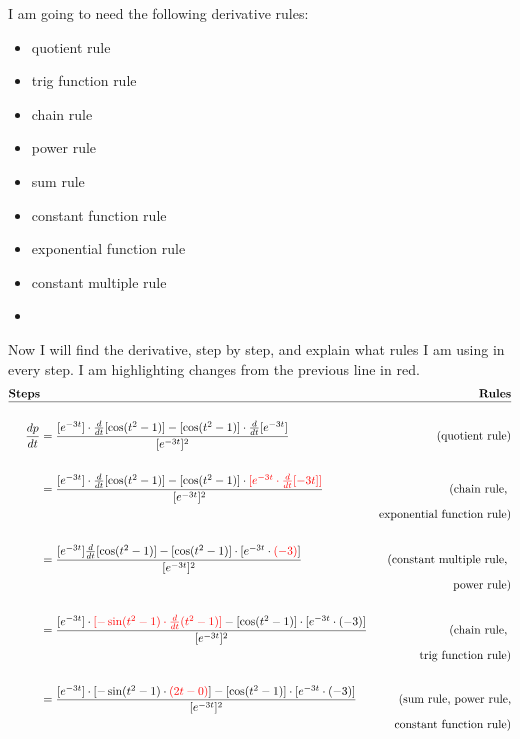 \documentclass[letter, 12pt]{article}
\newcommand{\red}[1]{\textcolor{red}{#1}}
\newcommand{\diff}[1]{\frac{d}{d#1}}
\begin{document}
I am going to need the following derivative rules:
\begin{multicols}{3}
	\begin{itemize}
		\item quotient rule
		\item trig function rule
		\item chain rule
		\item power rule
		\item sum rule
		\item constant function rule
		\item exponential function rule
		\item constant multiple rule
		\item[]
	\end{itemize}
\end{multicols}
Now I will find the derivative, step by step, and 
explain what rules I am using in every step.
I am highlighting changes from the previous line in red.
\begin{align*}
\textbf{Steps}& 
& \textbf{Rules} \\\hline
&&\\
\frac{dp}{dt} &= \frac{[e^{-3t}]\cdot \diff{t}[\cos(t^2-1)] - 
					   [\cos(t^2-1)]\cdot \diff{t}[e^{-3t}]}
					  {[e^{-3t}]^2}
& \textrm{(quotient rule)} \\ \\
&= \frac{[e^{-3t}] \cdot \diff{t}[\cos(t^2-1)] - 
         [\cos(t^2-1)]\cdot
         \red{[e^{-3t}\cdot\diff{t}[-3t]]}}
		{[e^{-3t}]^2} 
& \textrm{(chain rule, } \\ 
&& \textrm{exponential function rule)} \\ \\
&= \frac{[e^{-3t}] \diff{t}[\cos(t^2-1)] - 
         [\cos(t^2-1)]\cdot 
		 [e^{-3t}\cdot\red{(-3)}]}
		{[e^{-3t}]^2} 
& \textrm{(constant multiple rule, } \\
&& \textrm{power rule)} \\ \\
&= \frac{[e^{-3t}] \cdot
         \red{[-\sin(t^2-1)\cdot\diff{t}(t^2-1)]} - 
		 [\cos(t^2-1)]\cdot 
         [e^{-3t}\cdot(-3)]}
		{[e^{-3t}]^2}
& \textrm{(chain rule, } \\
&& \textrm{trig function rule)} \\ \\
&= \frac{[e^{-3t}] \cdot
         [-\sin(t^2-1)\cdot \red{(2t-0)}] - 
		 [\cos(t^2-1)]\cdot 
         [e^{-3t}\cdot(-3)]}
		{[e^{-3t}]^2}
& \textrm{(sum rule, power rule,} \\
&& \textrm{constant function rule)}
\end{align*}
\end{document}

